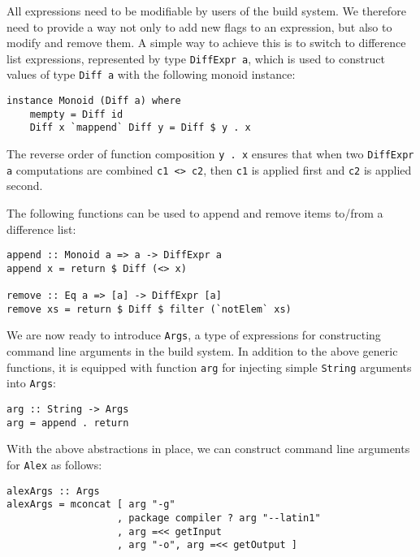 
All expressions need to be modifiable by users of the build system. We therefore
need to provide a way not only to add new flags to an expression, but also to
modify and remove them. A simple way to achieve this is to switch to difference
list expressions, represented by type \texttt{DiffExpr a}, which is used to
construct values of type \texttt{Diff a} with the following monoid instance:

\begin{lstlisting}[basicstyle=\ttfamily]
instance Monoid (Diff a) where
    mempty = Diff id
    Diff x `mappend` Diff y = Diff $ y . x
\end{lstlisting}

The reverse order of function composition \texttt{y . x} ensures that when two
\texttt{DiffExpr a} computations are combined \texttt{c1 <> c2}, then
\texttt{c1} is applied first and \texttt{c2} is applied second.

The following functions can be used to append and remove items to/from a
difference list:

\begin{lstlisting}[basicstyle=\ttfamily]
append :: Monoid a => a -> DiffExpr a
append x = return $ Diff (<> x)

remove :: Eq a => [a] -> DiffExpr [a]
remove xs = return $ Diff $ filter (`notElem` xs)
\end{lstlisting}

We are now ready to introduce \texttt{Args}, a type of expressions for
constructing command line arguments in the build system. In addition to the
above generic functions, it is equipped with function \texttt{arg} for injecting
simple \texttt{String} arguments into \texttt{Args}:

\begin{lstlisting}[basicstyle=\ttfamily]
arg :: String -> Args
arg = append . return
\end{lstlisting}

With the above abstractions in place, we can construct command line arguments
for \texttt{Alex} as follows:

\begin{lstlisting}[basicstyle=\ttfamily]
alexArgs :: Args
alexArgs = mconcat [ arg "-g"
                   , package compiler ? arg "--latin1"
                   , arg =<< getInput
                   , arg "-o", arg =<< getOutput ]
\end{lstlisting}

